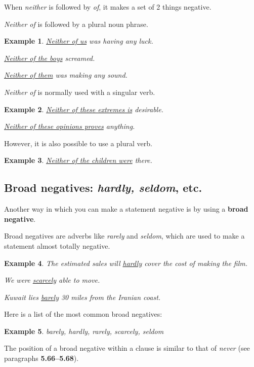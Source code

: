 \documentclass[oneside]{book}
\numberwithin{equation}{section}
\newtheorem{example}{Example}[section]
\begin{document}
%
\noindent{} When \textit{neither} is followed by \textit{of}, it makes a set of 2 things negative.

\textit{Neither of} is followed by a plural noun phrase.
\begin{example}
    \underline{Neither of us} was having any luck.
    
    \underline{Neither of the boys} screamed.
    
    \underline{Neither of them} was making any sound.
\end{example}
\textit{Neither of} is normally used with a singular verb.
\begin{example}
    \underline{Neither of these extremes is} desirable.
    
    \underline{Neither of these opinions proves} anything.
\end{example}
However, it is also possible to use a plural verb.
\begin{example}
    \underline{Neither of the children were} there.
\end{example}

\subsection{Broad negatives: \textit{hardly, seldom}, etc.}
\noindent{} Another way in which you can make a statement negative is by using a \textbf{broad negative}.

Broad negatives are adverbs like \textit{rarely} and \textit{seldom}, which are used to make a statement almost totally negative.
\begin{example}
    The estimated sales will \underline{hardly} cover the cost of making the film.
    
    We were \underline{scarcely} able to move.
    
    Kuwait lies \underline{barely} 30 miles from the Iranian coast.
\end{example}
Here is a list of the most common broad negatives:
\begin{example}
    barely, hardly, rarely, scarcely, seldom
\end{example}
%
\noindent{} The position of a broad negative within a clause is similar to that of \textit{never} (see paragraphs \textbf{5.66--5.68}).
\end{document}
